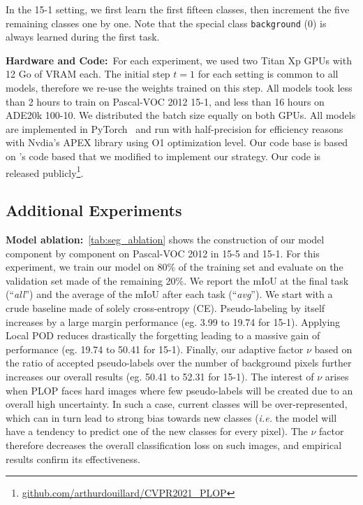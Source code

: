 In the 15-1 setting, we first learn the first fifteen classes, then increment the five remaining
classes one by one. Note that the special class \texttt{background} (0) is always learned during the
first task.

\noindent\textbf{Hardware and Code:\,} For each experiment, we used two Titan Xp GPUs with 12 Go of
VRAM each. The initial step $t=1$ for each setting is common to all models, therefore we re-use the
weights trained on this step. All models took less than 2 hours to train on Pascal-VOC 2012 15-1,
and less than 16 hours on ADE20k 100-10. We distributed the batch size equally on both GPUs. All
models are implemented in PyTorch~\citep{paszke2017pytorch} and run with half-precision for
efficiency reasons with Nvdia's APEX library using O1 optimization level. Our code base is based on
\citet{cermelli2020modelingthebackground}'s code based that we modified to implement our strategy.
Our code is released publicly\footnote{\href{https://github.com/arthurdouillard/CVPR2021_PLOP}{\scriptsize{github.com/arthurdouillard/CVPR2021\_PLOP}}}.

\subsection{Additional Experiments}

\noindent\textbf{Model ablation:\,} \autoref{tab:seg_ablation} shows the construction of our model
component by component on Pascal-VOC 2012 in 15-5 and 15-1. For this experiment, we train our model
on 80\% of the training set and evaluate on the validation set made of the remaining 20\%. We report
the mIoU at the final task (``\textit{all}'') and the average of the mIoU after each task
(``\textit{avg}''). We start with a crude baseline made of solely cross-entropy (CE).
Pseudo-labeling by itself increases by a large margin performance (eg. 3.99 to 19.74 for 15-1).
Applying Local POD reduces drastically the forgetting leading to a massive gain of performance (eg.
19.74 to 50.41 for 15-1). Finally, our adaptive factor $\nu$ based on the ratio of accepted
pseudo-labels over the number of background pixels further increases our overall results (eg. 50.41
to 52.31 for 15-1). The interest of $\nu$ arises when PLOP faces hard images where few pseudo-labels
will be created due to an overall high uncertainty. In such a case, current classes will be
over-represented, which can in turn lead to strong bias towards new classes (\textit{i.e.} the model
will have a tendency to predict one of the new classes for every pixel). The $\nu$ factor therefore
decreases the overall classification loss on such images, and empirical results confirm its
effectiveness.

